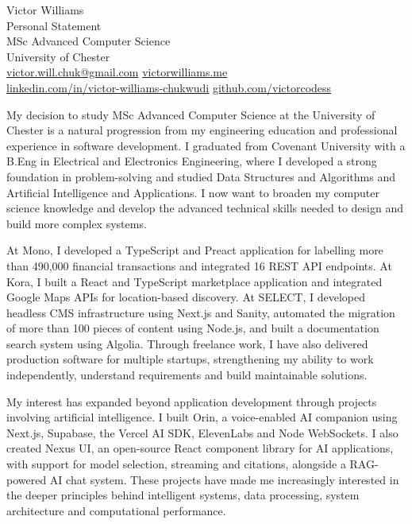 \documentclass[11pt,a4paper]{article}
\begin{document}
\begin{center}
{\Large Victor Williams}\\[0.4em]
Personal Statement\\[0.15em]
MSc Advanced Computer Science\\
University of Chester\\[0.4em]
{\small
\href{mailto:victor.will.chuk@gmail.com}{victor.will.chuk@gmail.com}
\quad
\href{https://www.victorwilliams.me/}{victorwilliams.me}\\[0.15em]
\href{https://www.linkedin.com/in/victor-williams-chukwudi/}{linkedin.com/in/victor-williams-chukwudi}
\quad
\href{https://github.com/victorcodess}{github.com/victorcodess}
}
\end{center}

\vspace{0.2em}

My decision to study MSc Advanced Computer Science at the University of Chester is a natural progression from my engineering education and professional experience in software development. I graduated from Covenant University with a B.Eng in Electrical and Electronics Engineering, where I developed a strong foundation in problem-solving and studied Data Structures and Algorithms and Artificial Intelligence and Applications. I now want to broaden my computer science knowledge and develop the advanced technical skills needed to design and build more complex systems.

At Mono, I developed a TypeScript and Preact application for labelling more than 490,000 financial transactions and integrated 16 REST API endpoints. At Kora, I built a React and TypeScript marketplace application and integrated Google Maps APIs for location-based discovery. At SELECT, I developed headless CMS infrastructure using Next.js and Sanity, automated the migration of more than 100 pieces of content using Node.js, and built a documentation search system using Algolia. Through freelance work, I have also delivered production software for multiple startups, strengthening my ability to work independently, understand requirements and build maintainable solutions.

My interest has expanded beyond application development through projects involving artificial intelligence. I built Orin, a voice-enabled AI companion using Next.js, Supabase, the Vercel AI SDK, ElevenLabs and Node WebSockets. I also created Nexus UI, an open-source React component library for AI applications, with support for model selection, streaming and citations, alongside a RAG-powered AI chat system. These projects have made me increasingly interested in the deeper principles behind intelligent systems, data processing, system architecture and computational performance.
\end{document}

